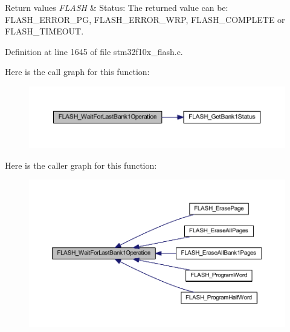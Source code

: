 \begin{DoxyRetVals}{Return values}
{\em F\+L\+A\+SH} & Status\+: The returned value can be\+: F\+L\+A\+S\+H\+\_\+\+E\+R\+R\+O\+R\+\_\+\+PG, F\+L\+A\+S\+H\+\_\+\+E\+R\+R\+O\+R\+\_\+\+W\+RP, F\+L\+A\+S\+H\+\_\+\+C\+O\+M\+P\+L\+E\+TE or F\+L\+A\+S\+H\+\_\+\+T\+I\+M\+E\+O\+UT. \\
\hline
\end{DoxyRetVals}


Definition at line 1645 of file stm32f10x\+\_\+flash.\+c.

Here is the call graph for this function\+:
\nopagebreak
\begin{figure}[H]
\begin{center}
\leavevmode
\includegraphics[width=350pt]{group___f_l_a_s_h___private___functions_ga470d345c2ea4304f899aa988bdd23824_cgraph}
\end{center}
\end{figure}
Here is the caller graph for this function\+:
\nopagebreak
\begin{figure}[H]
\begin{center}
\leavevmode
\includegraphics[width=350pt]{group___f_l_a_s_h___private___functions_ga470d345c2ea4304f899aa988bdd23824_icgraph}
\end{center}
\end{figure}
\mbox{\label{group___f_l_a_s_h___private___functions_ga2ad803999ae93ec03700983c59cae264}} 
